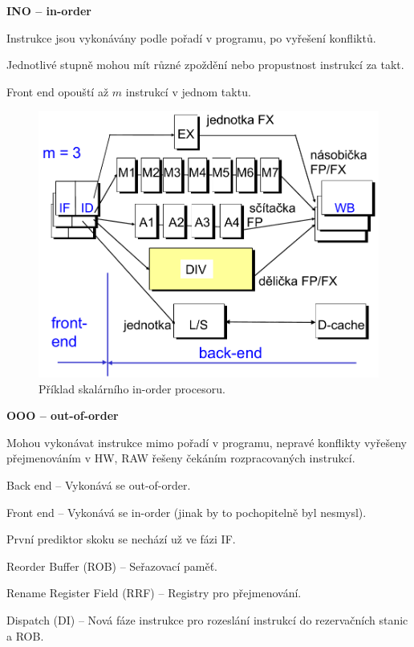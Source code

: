 \begin{compactitem}
    \item \textbf{INO -- in-order} \begin{compactitem}
        \item Instrukce jsou vykonávány podle pořadí v programu, po vyřešení konfliktů.
        \item Jednotlivé stupně mohou mít různé zpoždění nebo propustnost instrukcí za takt.
        \item Front end opouští až $m$ instrukcí v jednom taktu.
    \end{compactitem}

    \begin{figure}[H]
        \centering
        \includegraphics[width=0.75\linewidth]{ino.pdf}
        \caption{Příklad skalárního in-order procesoru.}
    \end{figure}

    \item \textbf{OOO -- out-of-order} \begin{compactitem}
        \item Mohou vykonávat instrukce mimo pořadí v programu, nepravé konflikty vyřešeny přejmenováním v HW, RAW řešeny čekáním rozpracovaných instrukcí.
        \item Back end -- Vykonává se out-of-order.
        \item Front end -- Vykonává se in-order (jinak by to pochopitelně byl nesmysl).
        \item První prediktor skoku se nechází už ve fázi IF.
        \item Reorder Buffer (ROB) -- Seřazovací paměť.
        \item Rename Register Field (RRF) -- Registry pro přejmenování.
        \item Dispatch (DI) -- Nová fáze instrukce pro rozeslání instrukcí do rezervačních stanic a ROB.
    \end{compactitem}


\end{compactitem}
